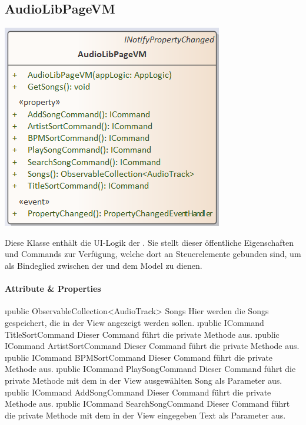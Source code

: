 \documentclass[../entwurf.tex]{subfiles}
\begin{document}
\subsection{AudioLibPageVM}
\begin{minipage}{0.55\textwidth}
\includegraphics[scale=0.75]{../graphics/vm_klassen/AudioLibPageVM.png}
\end{minipage}
\begin{minipage}{0.45\textwidth}
Diese Klasse enthält die UI-Logik der . Sie stellt dieser öffentliche Eigenschaften und Commands zur Verfügung, welche dort an Steuerelemente gebunden sind, um als Bindeglied zwischen der  und dem Model zu dienen.
\end{minipage}
\paragraph{Attribute \& Properties}
\begin{itemize}
	\i{public ObservableCollection<AudioTrack> Songs} Hier werden die Songs gespeichert, die in der View angezeigt werden sollen.
	\i{public ICommand TitleSortCommand} Dieser Command führt die private Methode  aus.
	\i{public ICommand ArtistSortCommand} Dieser Command führt die private Methode  aus.
	\i{public ICommand BPMSortCommand} Dieser Command führt die private Methode  aus.
	\i{public ICommand PlaySongCommand} Dieser Command führt die private Methode  mit dem in der View ausgewählten Song als Parameter aus.
	\i{public ICommand AddSongCommand} Dieser Command führt die private Methode  aus.
	\i{public ICommand SearchSongCommand} Dieser Command führt die private Methode  mit dem in der View eingegeben Text als Parameter aus.
\end{itemize}
\end{document}
